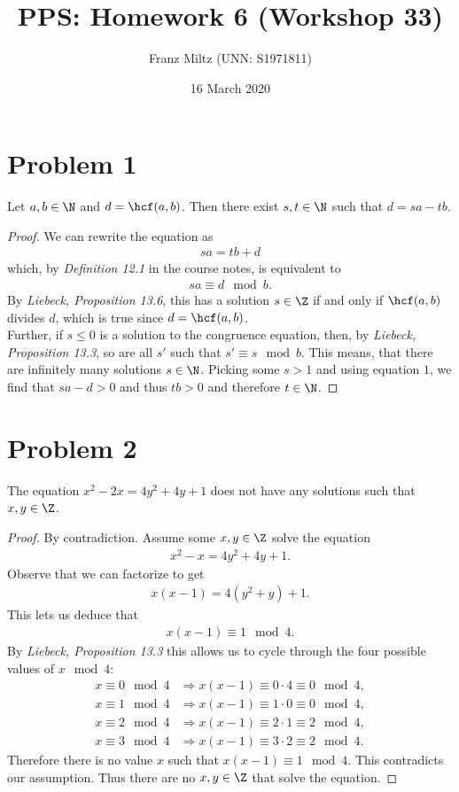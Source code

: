 \documentclass{article}
\title{PPS: Homework 6 (Workshop 33)}
\author{Franz Miltz (UNN: S1971811)}
\date{16 March 2020}
\begin{document}
\maketitle
\section*{Problem 1}
\begin{claim}
  Let $a,b\in\N$ and $d=\hcf(a,b)$. Then there exist $s,t\in\N$ such that $d=sa-tb$.
\end{claim}
\begin{proof}
  We can rewrite the equation as
  \begin{align}
    \label{eq:1}
    sa = tb + d
  \end{align}
  which, by \emph{Definition 12.1} in the course notes, is equivalent to
  \begin{align*}
    sa \equiv d \mod b.
  \end{align*}
  By \emph{Liebeck, Proposition 13.6}, this has a solution $s\in\Z$ if and only if $\hcf(a,b)$ divides $d$, which is true since $d=\hcf(a,b)$.\\
  Further, if $s\leq 0$ is a solution to the congruence equation, then, by \emph{Liebeck, Proposition 13.3}, so are all $s'$ such that $s' \equiv s \mod b$.
  This means, that there are infinitely many solutions $s\in\N$.
  Picking some $s>1$ and using equation $1$, we find that $sa-d>0$ and thus $tb>0$ and therefore $t\in\N$.
\end{proof}
\section*{Problem 2}
\begin{claim}
  The equation $x^2-2x=4y^2+4y+1$ does not have any solutions such that $x,y\in\Z$.
\end{claim}
\begin{proof}
  By contradiction. Assume some $x,y\in\Z$ solve the equation
  \begin{align*}
    x^2-x=4y^2+4y+1.
  \end{align*}
  Observe that we can factorize to get
  \begin{align*}
    x(x-1)=4(y^2+y)+1.
  \end{align*}
  This lets us deduce that
  \begin{align*}
    x(x-1) \equiv 1 \mod 4.
  \end{align*}
  By \emph{Liebeck, Proposition 13.3} this allows us to cycle through the four possible values of $x\mod 4$:
  \begin{align*}
    x\equiv 0 \mod 4 & \Rightarrow x(x-1) \equiv 0\cdot 4 \equiv 0 \mod 4, \\
    x\equiv 1 \mod 4 & \Rightarrow x(x-1) \equiv 1\cdot 0 \equiv 0 \mod 4, \\
    x\equiv 2 \mod 4 & \Rightarrow x(x-1) \equiv 2\cdot 1 \equiv 2 \mod 4, \\
    x\equiv 3 \mod 4 & \Rightarrow x(x-1) \equiv 3\cdot 2 \equiv 2 \mod 4.
  \end{align*}
  Therefore there is no value $x$ such that $x(x-1)\equiv 1 \mod 4$.
  This contradicts our assumption.
  Thus there are no $x,y\in\Z$ that solve the equation.
\end{proof}
\end{document}
